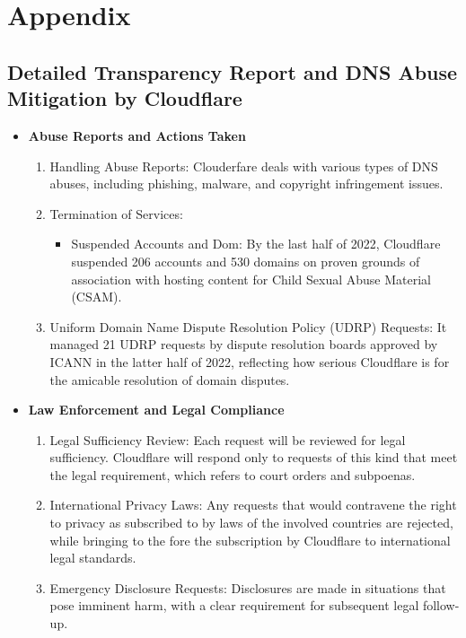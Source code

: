 \chapter{Appendix}

\section{Detailed Transparency Report and DNS Abuse Mitigation by Cloudflare}
\label{app:cloudfare}


\begin{itemize}
    \item \textbf{Abuse Reports and Actions Taken}
    \begin{enumerate}
        \item Handling Abuse Reports: Clouderfare deals with various types of DNS abuses, including phishing, malware, and copyright infringement issues.
        \item Termination of Services: 
        \begin{itemize}
            \item Suspended Accounts and Dom: By the last half of 2022, Cloudflare suspended 206 accounts and 530 domains on proven grounds of association with hosting content for Child Sexual Abuse Material (CSAM).
        \end{itemize}
        \item  Uniform Domain Name Dispute Resolution Policy (UDRP) Requests: It managed 21 UDRP requests by dispute resolution boards approved by ICANN in the latter half of 2022, reflecting how serious Cloudflare is for the amicable resolution of domain disputes.
        \end{enumerate}
    \item \textbf{Law Enforcement and Legal Compliance}
    \begin{enumerate}
        \item Legal Sufficiency Review: Each request will be reviewed for legal sufficiency. Cloudflare will respond only to requests of this kind that meet the legal requirement, which refers to court orders and subpoenas.
        \item International Privacy Laws: Any requests that would contravene the right to privacy as subscribed to by laws of the involved countries are rejected, while bringing to the fore the subscription by Cloudflare to international legal standards.
        \item Emergency Disclosure Requests: Disclosures are made in situations that pose imminent harm, with a clear requirement for subsequent legal follow-up.

\end{enumerate}
\end{itemize}
